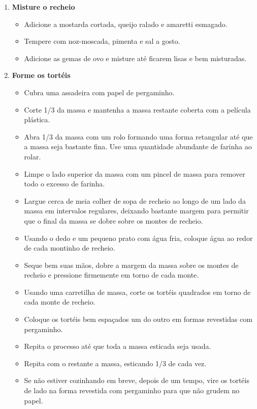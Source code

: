 \documentclass [11pt, letterpaper] {article}
\begin{document}
\begin {description}
\begin {enumerate}
\item {\bf Misture o recheio}
\begin {itemize}
\item Adicione a mostarda cortada, queijo ralado e amaretti esmagado.
\item Tempere com noz-moscada, pimenta e sal a gosto.
\item Adicione as gemas de ovo e misture até ficarem lisas e bem misturadas.
\end {itemize}


\item {\bf Forme os tort\'eis}
\begin {itemize}
\item Cubra uma assadeira com papel de pergaminho.
\item Corte 1/3 da massa e mantenha a massa restante coberta com a película plástica.
\item Abra 1/3 da massa com um rolo formando uma forma retangular até que a massa seja bastante fina. Use uma quantidade abundante de farinha ao rolar.
\item Limpe o lado superior da massa com um pincel de massa para remover todo o excesso de farinha.
\item Largue cerca de meia colher de sopa de recheio ao longo de um lado da massa em intervalos regulares, deixando bastante margem para permitir que o final da massa se dobre sobre os montes de recheio.
\item Usando o dedo e um pequeno prato com água fria, coloque água ao redor de cada montinho de recheio.
\item Seque bem suas mãos, dobre a margem da massa sobre os montes de recheio e pressione firmemente em torno de cada monte.
\item Usando uma carretilha de massa, corte os tort\'eis quadrados em torno de cada monte de recheio.
\item Coloque os tort\'eis bem espa\c{c}ados um do outro em formas revestidas com pergaminho.
\item Repita o processo até que toda a massa esticada seja usada.
\item Repita com o restante a massa, esticando 1/3 de cada vez.
\item Se não estiver cozinhando em breve, depois de um tempo, vire os tort\'eis de lado na forma revestida com pergaminho para que não grudem no papel.
\end {itemize}


\end{enumerate}
\end{description}
\end{document}
